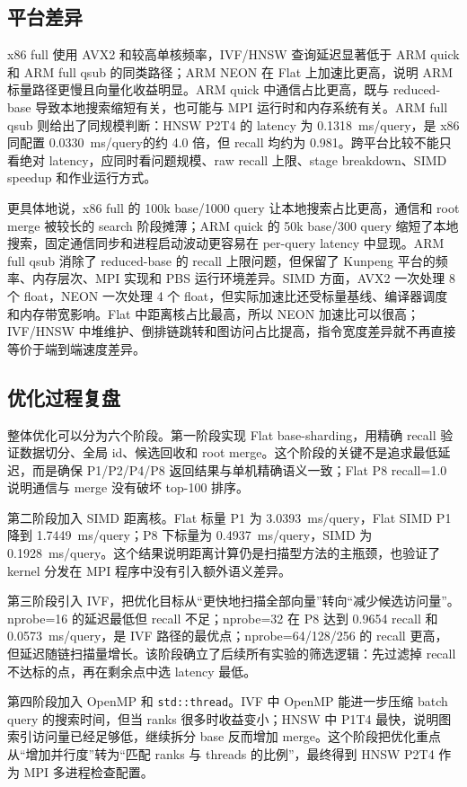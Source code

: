 \documentclass[11pt,a4paper]{article}
\newcommand{\msq}{ms/query}
\begin{document}
\subsection{平台差异}

x86 full 使用 AVX2 和较高单核频率，IVF/HNSW 查询延迟显著低于 ARM quick 和 ARM full qsub 的同类路径；ARM NEON 在 Flat 上加速比更高，说明 ARM 标量路径更慢且向量化收益明显。ARM quick 中通信占比更高，既与 reduced-base 导致本地搜索缩短有关，也可能与 MPI 运行时和内存系统有关。ARM full qsub 则给出了同规模判断：HNSW P2T4 的 latency 为 0.1318~\msq，是 x86 同配置 0.0330~\msq 的约 4.0 倍，但 recall 均约为 0.981。跨平台比较不能只看绝对 latency，应同时看问题规模、raw recall 上限、stage breakdown、SIMD speedup 和作业运行方式。

更具体地说，x86 full 的 100k base/1000 query 让本地搜索占比更高，通信和 root merge 被较长的 search 阶段摊薄；ARM quick 的 50k base/300 query 缩短了本地搜索，固定通信同步和进程启动波动更容易在 per-query latency 中显现。ARM full qsub 消除了 reduced-base 的 recall 上限问题，但保留了 Kunpeng 平台的频率、内存层次、MPI 实现和 PBS 运行环境差异。SIMD 方面，AVX2 一次处理 8 个 float，NEON 一次处理 4 个 float，但实际加速比还受标量基线、编译器调度和内存带宽影响。Flat 中距离核占比最高，所以 NEON 加速比可以很高；IVF/HNSW 中堆维护、倒排链跳转和图访问占比提高，指令宽度差异就不再直接等价于端到端速度差异。

\subsection{优化过程复盘}

整体优化可以分为六个阶段。第一阶段实现 Flat base-sharding，用精确 recall 验证数据切分、全局 id、候选回收和 root merge。这个阶段的关键不是追求最低延迟，而是确保 P1/P2/P4/P8 返回结果与单机精确语义一致；Flat P8 recall=1.0 说明通信与 merge 没有破坏 top-100 排序。

第二阶段加入 SIMD 距离核。Flat 标量 P1 为 3.0393~\msq，Flat SIMD P1 降到 1.7449~\msq；P8 下标量为 0.4937~\msq，SIMD 为 0.1928~\msq。这个结果说明距离计算仍是扫描型方法的主瓶颈，也验证了 kernel 分发在 MPI 程序中没有引入额外语义差异。

第三阶段引入 IVF，把优化目标从“更快地扫描全部向量”转向“减少候选访问量”。nprobe=16 的延迟最低但 recall 不足；nprobe=32 在 P8 达到 0.9654 recall 和 0.0573~\msq，是 IVF 路径的最优点；nprobe=64/128/256 的 recall 更高，但延迟随链扫描量增长。该阶段确立了后续所有实验的筛选逻辑：先过滤掉 recall 不达标的点，再在剩余点中选 latency 最低。

第四阶段加入 OpenMP 和 \texttt{std::thread}。IVF 中 OpenMP 能进一步压缩 batch query 的搜索时间，但当 ranks 很多时收益变小；HNSW 中 P1T4 最快，说明图索引访问量已经足够低，继续拆分 base 反而增加 merge。这个阶段把优化重点从“增加并行度”转为“匹配 ranks 与 threads 的比例”，最终得到 HNSW P2T4 作为 MPI 多进程检查配置。
\end{document}
